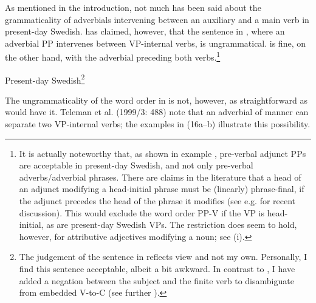 \documentclass[output=paper, colorlinks, citecolor=brown]{langscibook}
\begin{document}
As mentioned in the introduction, not much has been said about the grammaticality of adverbials intervening between an auxiliary and a main verb in present-day Swedish. \citet[157]{Petzell2011} has claimed, however, that the sentence in , where an adverbial PP intervenes between VP-internal verbs, is ungrammatical.  is fine, on the other hand, with the adverbial preceding both verbs.\footnote{It is actually noteworthy that, as shown in example , pre-verbal adjunct PPs are acceptable in present-day Swedish, and not only pre-verbal adverbs\slash adverbial phrases. There are claims in the literature that a head of an adjunct modifying a head-initial phrase must be (linearly) phrase-final, if the adjunct precedes the head of the phrase it modifies (see e.g. \citet{Haider_left-left_nodate} for recent discussion). This would exclude the word order PP-V if the VP is head-initial, as are present-day Swedish VPs. The restriction does seem to hold, however, for attributive adjectives modifying a noun; see (i). 
\z}

\ea Present-day Swedish\footnote{The judgement of the sentence in  reflects  view and not my own. Personally, I find this sentence acceptable, albeit a bit awkward. In contrast to \citet[157]{Petzell2011}, I have added a negation between the subject and the finite verb to disambiguate from embedded V-to-C (see further ).}
\label{ex:sangfelt:15}

\z 
\z 


The ungrammaticality of the word order in  is not, however, as straightforward as \citet{Petzell2011} would have it. Teleman et al. (1999/3: 488) note that an adverbial of manner can separate two VP-internal verbs; the examples in (16a–b) illustrate this possibility.
\end{document}
